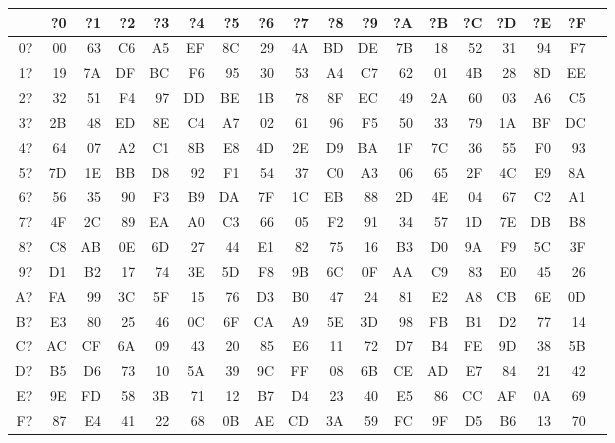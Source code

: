 \begin{table}[h]
  {\ttfamily
    \begin{tabular}{|r||r|r|r|r|r|r|r|r|r|r|r|r|r|r|r|r|r|}
      \hline
      & ?0 & ?1 & ?2 & ?3 & ?4 & ?5 & ?6 & ?7 & ?8 & ?9 & ?A & ?B & ?C & ?D & ?E & ?F \\
      \hline
      0? & 00 & 63 & C6 & A5 & EF & 8C & 29 & 4A & BD & DE & 7B & 18 & 52 & 31 & 94 & F7 \\
      1? & 19 & 7A & DF & BC & F6 & 95 & 30 & 53 & A4 & C7 & 62 & 01 & 4B & 28 & 8D & EE \\
      2? & 32 & 51 & F4 & 97 & DD & BE & 1B & 78 & 8F & EC & 49 & 2A & 60 & 03 & A6 & C5 \\
      3? & 2B & 48 & ED & 8E & C4 & A7 & 02 & 61 & 96 & F5 & 50 & 33 & 79 & 1A & BF & DC \\
      4? & 64 & 07 & A2 & C1 & 8B & E8 & 4D & 2E & D9 & BA & 1F & 7C & 36 & 55 & F0 & 93 \\
      5? & 7D & 1E & BB & D8 & 92 & F1 & 54 & 37 & C0 & A3 & 06 & 65 & 2F & 4C & E9 & 8A \\
      6? & 56 & 35 & 90 & F3 & B9 & DA & 7F & 1C & EB & 88 & 2D & 4E & 04 & 67 & C2 & A1 \\
      7? & 4F & 2C & 89 & EA & A0 & C3 & 66 & 05 & F2 & 91 & 34 & 57 & 1D & 7E & DB & B8 \\
      8? & C8 & AB & 0E & 6D & 27 & 44 & E1 & 82 & 75 & 16 & B3 & D0 & 9A & F9 & 5C & 3F \\
      9? & D1 & B2 & 17 & 74 & 3E & 5D & F8 & 9B & 6C & 0F & AA & C9 & 83 & E0 & 45 & 26 \\
      A? & FA & 99 & 3C & 5F & 15 & 76 & D3 & B0 & 47 & 24 & 81 & E2 & A8 & CB & 6E & 0D \\
      B? & E3 & 80 & 25 & 46 & 0C & 6F & CA & A9 & 5E & 3D & 98 & FB & B1 & D2 & 77 & 14 \\
      C? & AC & CF & 6A & 09 & 43 & 20 & 85 & E6 & 11 & 72 & D7 & B4 & FE & 9D & 38 & 5B \\
      D? & B5 & D6 & 73 & 10 & 5A & 39 & 9C & FF & 08 & 6B & CE & AD & E7 & 84 & 21 & 42 \\
      E? & 9E & FD & 58 & 3B & 71 & 12 & B7 & D4 & 23 & 40 & E5 & 86 & CC & AF & 0A & 69 \\
      F? & 87 & E4 & 41 & 22 & 68 & 0B & AE & CD & 3A & 59 & FC & 9F & D5 & B6 & 13 & 70 \\
      \hline
    \end{tabular}
  }
\end{table}

